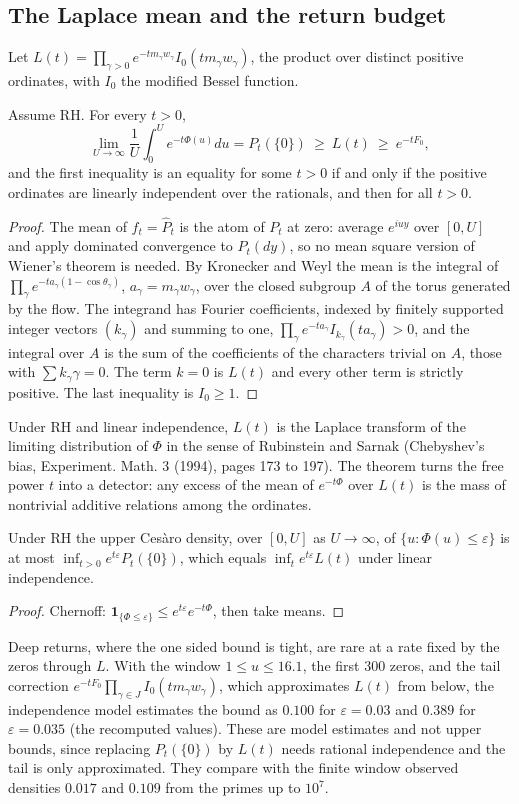 \subsection{The Laplace mean and the return budget}
Let $L(t)=\prod_{\gamma>0}e^{-tm_\gamma w_\gamma}I_0(tm_\gamma w_\gamma)$, the product over distinct positive ordinates, with $I_0$ the modified Bessel function.
\begin{theorem}\label{st:thm:mean}
Assume RH. For every $t>0$,
\[
\lim_{U\to\infty}\frac1U\int_0^Ue^{-t\Phi(u)}du=P_t(\{0\})\ \ge\ L(t)\ \ge\ e^{-tF_0},
\]
and the first inequality is an equality for some $t>0$ if and only if the positive ordinates are linearly independent over the rationals, and then for all $t>0$.
\end{theorem}
\begin{proof}
The mean of $f_t=\hat P_t$ is the atom of $P_t$ at zero: average $e^{iuy}$ over $[0,U]$ and apply dominated convergence to $P_t(dy)$, so no mean square version of Wiener's theorem is needed. By Kronecker and Weyl the mean is the integral of $\prod_\gamma e^{-ta_\gamma(1-\cos\theta_\gamma)}$, $a_\gamma=m_\gamma w_\gamma$, over the closed subgroup $A$ of the torus generated by the flow. The integrand has Fourier coefficients, indexed by finitely supported integer vectors $(k_\gamma)$ and summing to one, $\prod_\gamma e^{-ta_\gamma}I_{k_\gamma}(ta_\gamma)>0$, and the integral over $A$ is the sum of the coefficients of the characters trivial on $A$, those with $\sum k_\gamma\gamma=0$. The term $k=0$ is $L(t)$ and every other term is strictly positive. The last inequality is $I_0\ge1$.
\end{proof}
Under RH and linear independence, $L(t)$ is the Laplace transform of the limiting distribution of $\Phi$ in the sense of Rubinstein and Sarnak (Chebyshev's bias, Experiment. Math. 3 (1994), pages 173 to 197). The theorem turns the free power $t$ into a detector: any excess of the mean of $e^{-t\Phi}$ over $L(t)$ is the mass of nontrivial additive relations among the ordinates.
\begin{corollary}\label{st:cor:budget}
Under RH the upper Ces\`aro density, over $[0,U]$ as $U\to\infty$, of $\{u:\Phi(u)\le\varepsilon\}$ is at most $\inf_{t>0}e^{t\varepsilon}P_t(\{0\})$, which equals $\inf_te^{t\varepsilon}L(t)$ under linear independence.
\end{corollary}
\begin{proof}
Chernoff: $\mathbf 1_{\{\Phi\le\varepsilon\}}\le e^{t\varepsilon}e^{-t\Phi}$, then take means.
\end{proof}
Deep returns, where the one sided bound is tight, are rare at a rate fixed by the zeros through $L$. With the window $1\le u\le16.1$, the first 300 zeros, and the tail correction $e^{-tF_0}\prod_{\gamma\in J}I_0(tm_\gamma w_\gamma)$, which approximates $L(t)$ from below, the independence model estimates the bound as $0.100$ for $\varepsilon=0.03$ and $0.389$ for $\varepsilon=0.035$ (the recomputed values). These are model estimates and not upper bounds, since replacing $P_t(\{0\})$ by $L(t)$ needs rational independence and the tail is only approximated. They compare with the finite window observed densities $0.017$ and $0.109$ from the primes up to $10^7$.

